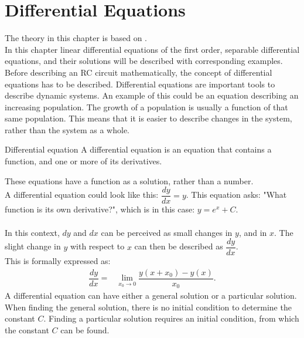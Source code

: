 \chapter{Differential Equations} 
The theory in this chapter is based on \cite{diffandcomplex}.\\ In this chapter linear differential equations of the first order, separable differential equations, and their solutions will be described with corresponding examples. \\

\noindent Before describing an RC circuit mathematically, the concept of differential equations has to be described. Differential equations are important tools to describe dynamic systems. An example of this could be an equation describing an increasing population. The growth of a population is usually a function of that same population. This means that it is easier to describe changes in the system, rather than the system as a whole. \\


\begin{definition}{Differential equation}{}
A differential equation is an equation that contains a function, and one or more of its derivatives.
\end{definition}
\noindent%
These equations have a function as a solution, rather than a number. 
\\
A differential equation could look like this: $\dfrac{dy}{dx} = y$. This equation asks: "What function is its own derivative?", which is in this case: $y=e^x+C$.
\\\\
In this context, $dy$ and $dx$ can be perceived as small changes in $y$, and in $x$. The slight change in $y$ with respect to $x$ can then be described as $\dfrac{dy}{dx}$.
\\
This is formally expressed as:
\\
\begin{align*}
	\dfrac{dy}{dx} =& \lim_{x_0\to 0} \dfrac{y(x+x_0)-y(x)}{x_0}.
\end{align*}
A differential equation can  have either a general solution or a particular solution. When finding the general solution, there is no initial condition to determine the constant $C$. Finding a particular solution requires an initial condition, from which the constant $C$ can be found.

